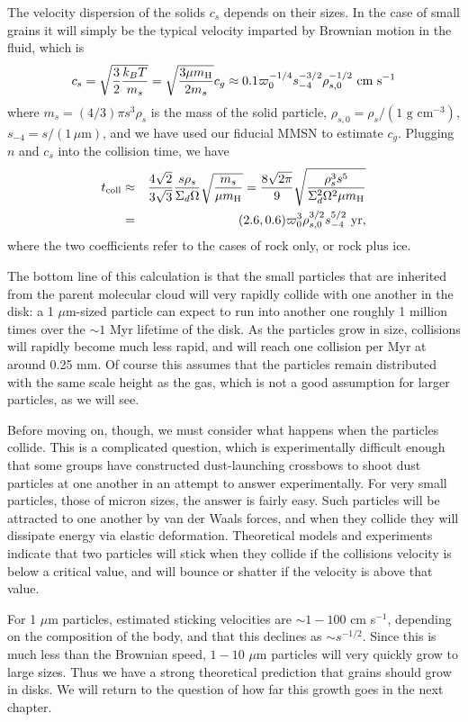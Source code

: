 The velocity dispersion of the solids $c_s$ depends on their sizes. In the case of small grains it will simply be the typical velocity imparted by Brownian motion in the fluid, which is
\begin{equation}
c_s = \sqrt{\frac{3}{2} \frac{k_B T}{m_s}} = \sqrt{\frac{3 \mu m_{\rm H}}{2 m_s}} c_g \approx 0.1 \varpi_0^{-1/4} s_{-4}^{-3/2} \rho_{s,0}^{-1/2}\mbox{ cm s}^{-1}
\end{equation}
where $m_s = (4/3)\pi s^3 \rho_s$ is the mass of the solid particle, $\rho_{s,0}=\rho_s/(1\mbox{ g cm}^{-3})$, $s_{-4} = s/(1\,\mu\mbox{m})$, and we have used our fiducial MMSN to estimate $c_g$. Plugging $n$ and $c_s$ into the collision time, we have
\begin{eqnarray}
t_{\rm coll} & \approx & \frac{4\sqrt{2}}{3\sqrt{3}}\frac{s\rho_s}{\Sigma_d \Omega}\sqrt{\frac{m_s}{\mu m_{\rm H}}} = \frac{8\sqrt{2\pi}}{9} \sqrt{\frac{\rho_s^3 s^5}{\Sigma_d^2\Omega^2 \mu m_{\rm H}}}
\nonumber \\
& = & (2.6, 0.6) \varpi_0^3 \rho_{s,0}^{3/2} s_{-4}^{5/2}\mbox{ yr},
\end{eqnarray}
where the two coefficients refer to the cases of rock only, or rock plus ice.

The bottom line of this calculation is that the small particles that are inherited from the parent molecular cloud will very rapidly collide with one another in the disk: a 1 $\mu$m-sized particle can expect to run into another one roughly 1 million times over the $\sim 1$ Myr lifetime of the disk. As the particles grow in size, collisions will rapidly become much less rapid, and will reach one collision per Myr at around 0.25 mm. Of course this assumes that the particles remain distributed with the same scale height as the gas, which is not a good assumption for larger particles, as we will see.

Before moving on, though, we must consider what happens when the particles collide. This is a complicated question, which is experimentally difficult enough that some groups have constructed dust-launching crossbows to shoot dust particles at one another in an attempt to answer experimentally. For very small particles, those of micron sizes, the answer is fairly easy. Such particles will be attracted to one another by van der Waals forces, and when they collide they will dissipate energy via elastic deformation. Theoretical models and experiments indicate that two particles will stick when they collide if the collisions velocity is below a critical value, and will bounce or shatter if the velocity is above that value.

For 1 $\mu$m particles, estimated sticking velocities are $\sim 1-100$ cm s$^{-1}$, depending on the composition of the body, and that this declines as $\sim s^{-1/2}$. Since this is much less than the Brownian speed, $1-10$ $\mu$m particles will very quickly grow to large sizes. Thus we have a strong theoretical prediction that grains should grow in disks. We will return to the question of how far this growth goes in the next chapter.


